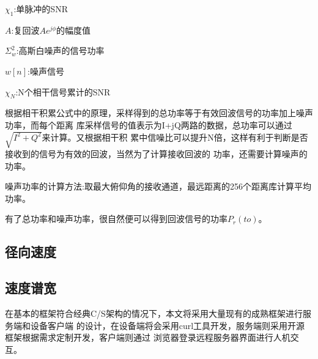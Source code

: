 \documentclass[a4paper,12pt]{report}
\begin{document}
\begin{spacing}{1.5}
\begin{proposition}[相干积累]
    $\chi_1$:单脉冲的SNR

    $A$:复回波$Ae^{j\phi}$的幅度值

    $\Sigma_w^2$:高斯白噪声的信号功率

    $w[n]$:噪声信号

    $\chi_N$:N个相干信号累计的SNR

\end{proposition}

根据相干积累公式中的原理，采样得到的总功率等于有效回波信号的功率加上噪声功率，而每个距离
库采样信号的值表示为I+jQ两路的数据，总功率可以通过$\sqrt{I^2+Q^2}$来计算。又根据相干积
累中信噪比可以提升N倍，这样有利于判断是否接收到的信号为有效的回波，当然为了计算接收回波的
功率，还需要计算噪声的功率。

噪声功率的计算方法:取最大俯仰角的接收通道，最远距离的256个距离库计算平均功率。

有了总功率和噪声功率，很自然便可以得到回波信号的功率$P_r(to)$。

\subsection{径向速度} 


\subsection{速度谱宽}



在基本的框架符合经典C/S架构的情况下，本文将采用大量现有的成熟框架进行服务端和设备客户端
的设计，在设备端将会采用curl工具开发，服务端则采用开源框架根据需求定制开发，客户端则通过
浏览器登录远程服务器界面进行人机交互。

\end{spacing}

\end{document}
